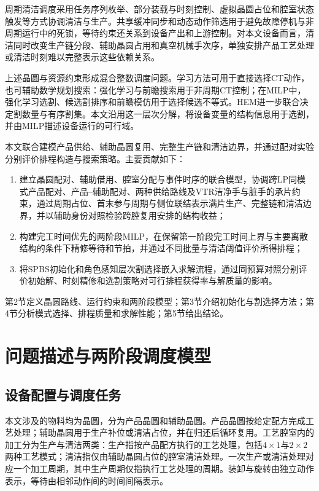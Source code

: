 \documentclass[final,5p,times,twocolumn]{elsarticle}
\begin{document}
周期清洁调度采用任务序列枚举、部分装载与时刻控制、虚拟晶圆占位和腔室状态触发等方式协调清洁与生产\citep{kim2013cleaning,yu2020delay,qiao2022binary,li2022conditioncleaning}。共享缓冲同步和动态动作筛选用于避免故障停机与非周期运行中的死锁\citep{zhu2025failuredeadlock,kim2025noncyclicdeadlock}，等待约束还关系到设备产出和上游控制\citep{lee2018waiting}。对本文设备而言，清洁同时改变生产链分段、辅助晶圆占用和真空机械手次序，单独安排产品工艺处理或清洁时刻难以完整表示这些依赖关系。

上述晶圆与资源约束形成混合整数调度问题。学习方法可用于直接选择CT动作，也可辅助数学规划搜索：强化学习与前瞻搜索用于非周期CT控制\citep{kim2025adaptivecluster}；在MILP中，强化学习选割、候选割排序和前瞻模仿用于选择候选不等式\citep{tang2020cut,huang2022cutranking,paulus2022looking}。HEM进一步联合决定割数量与有序割集\citep{wang2023hem}。本文沿用这一层次分解，将设备变量的结构信息用于选割，并由MILP描述设备运行的可行域。

本文联合建模产品供给、辅助晶圆复用、完整生产链和清洁边界，并通过配对实验分别评价排程构造与搜索策略。主要贡献如下：
\begin{enumerate}[leftmargin=*]
\item 建立晶圆配对、辅助借用、腔室分配与事件时序的联合模型，协调跨LP同模式产品配对、产品--辅助配对、两种供给路线及VTR洁净手与脏手的承片约束，通过周期占位、首末参与周期与侧位联结表示满片生产、完整链和清洁边界，并以辅助身份对照检验跨腔复用安排的结构收益；
\item 构建完工时间优先的两阶段MILP，在保留第一阶段完工时间上界与主要离散结构的条件下精修等待和节拍，并通过不同批量与清洁阈值评价所得排程；
\item 将SPBS初始化和角色感知层次割选择嵌入求解流程，通过同预算对照分别评价初始解、时刻精修和选割策略对可行排程获得率与解质量的影响。
\end{enumerate}

第2节定义晶圆路线、运行约束和两阶段模型；第3节介绍初始化与割选择方法；第4节分析模式选择、排程质量和求解性能；第5节给出结论。

\section{问题描述与两阶段调度模型}
\setcounter{equation}{0}

\subsection{设备配置与调度任务}

本文涉及的物料均为晶圆，分为产品晶圆和辅助晶圆。产品晶圆按给定配方完成工艺处理；辅助晶圆用于生产补位或清洁占位，并在归还后循环复用。工艺腔室内的加工分为生产与清洁两类：生产指按产品配方执行的工艺处理，包括$4\times1$与$2\times2$两种工艺模式；清洁指仅由辅助晶圆占位的腔室清洁处理。一次生产或清洁处理对应一个加工周期，其中生产周期仅指执行工艺处理的周期。装卸与旋转由独立动作表示，等待由相邻动作间的时间间隔表示。
\end{document}

